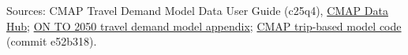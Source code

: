 \documentclass[10pt,a4paper]{extarticle}
\begin{document}
\vspace{4pt}
{\footnotesize Sources: CMAP Travel Demand Model Data User Guide (c25q4),
\href{https://datahub.cmap.illinois.gov/documents/a14d641dbe184704ab597479b103986c/explore}{CMAP Data Hub};
\href{https://cmap.illinois.gov/wp-content/uploads/ON-TO-2050-Update-Travel-Demand-Model-Documentation-Appendix.pdf}{ON TO 2050 travel demand model appendix};
\href{https://github.com/CMAP-REPOS/cmap_trip-based_model}{CMAP trip-based model code} (commit e52b318).}
\end{document}
